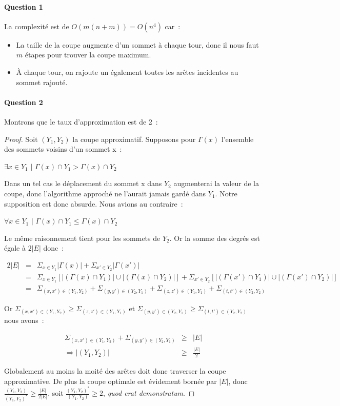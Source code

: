 \paragraph{Question 1}
La complexité est de $O(m(n+m))=O(n^4)$ car~:
\begin{itemize}
\item La taille de la coupe augmente d'un sommet à chaque tour, donc
il nous faut $m$ étapes pour trouver la coupe maximum.
\item À chaque tour, on rajoute un également toutes les arêtes
incidentes au sommet rajouté.
\end{itemize}

\paragraph{Question 2}
Montrons que le taux d'approximation est de 2~:
\begin{proof}Soit $(Y_1,Y_2)$ la coupe approximatif. Supposons pour $\Gamma(x)$ l'ensemble des sommets voisins d'un sommet x~:

$\exists x \in Y_1 \text{ | } \Gamma(x) \cap Y_1 > \Gamma(x) \cap Y_2$

Dans un tel cas le déplacement du sommet x dans $Y_2$ augmenterai la valeur de la coupe, donc l'algorithme approché ne l'aurait jamais gardé dans $Y_1$. Notre supposition est donc absurde. Nous avions au contraire~:

$\forall x \in Y_1 \text{ | } \Gamma(x) \cap Y_1 \leq \Gamma(x) \cap Y_2$

Le même raisonnement tient pour les sommets de $Y_2$. Or la somme des degrés est égale à $2|E|$ donc~:

\begin{eqnarray*}
2|E| &=& \Sigma_{x \in Y_1}|\Gamma(x)|  + \Sigma_{x' \in Y_2}|\Gamma(x')| \\
	 &=& \Sigma_{x \in Y_1}[|(\Gamma(x)\cap{} Y_1)|\cup|(\Gamma(x)\cap{}Y_2)|] +
	 	 \Sigma_{x' \in Y_2}[|(\Gamma(x')\cap{} Y_1)|\cup|(\Gamma(x')\cap{}Y_2)|] \\
	 &=& \Sigma_{(x,x') \in (Y_1,Y_2)} +
	 	 \Sigma_{(y,y') \in (Y_2,Y_1)} + 
	 	 \Sigma_{(z,z') \in (Y_1,Y_1)} +
	 	 \Sigma_{(t,t') \in (Y_2,Y_2)} 
\end{eqnarray*}

Or $\Sigma_{(x,x') \in (Y_1,Y_2)} \geq \Sigma_{(z,z') \in (Y_1,Y_1)}$ et $\Sigma_{(y,y') \in (Y_2,Y_1)} \geq \Sigma_{(t,t') \in (Y_2,Y_2)}$ nous avons~:

\begin{eqnarray*}
\Sigma_{(x,x') \in (Y_1,Y_2)} + \Sigma_{(y,y') \in (Y_2,Y_1)} &\geq& |E| \\
\Rightarrow |(Y_1, Y_2)| &\geq& \frac{|E|}{2}
\end{eqnarray*}

Globalement au moins la moité des arêtes doit donc traverser la coupe
approximative. De plus la coupe optimale est évidement bornée par
$|E|$, donc $\frac{(Y_1,Y_2)}{(Y_1,Y_2)^*} \geq \frac{|E|}{2|E|}$,
soit $\frac{(Y_1,Y_2)^*}{(Y_1,Y_2)} \geq 2$, \emph{quod erat
demonstratum}.
\end{proof}

